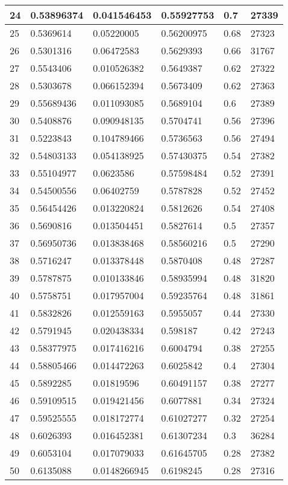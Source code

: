 \begin{longtable}{|l|l|l|l|l|l|}
24 & 0.53896374 & 0.041546453 & 0.55927753 & 0.7 & 27339 \\ \hline 
25 & 0.5369614 & 0.05220005 & 0.56200975 & 0.68 & 27323 \\ \hline 
26 & 0.5301316 & 0.06472583 & 0.5629393 & 0.66 & 31767 \\ \hline 
27 & 0.5543406 & 0.010526382 & 0.5649387 & 0.62 & 27322 \\ \hline 
28 & 0.5303678 & 0.066152394 & 0.5673409 & 0.62 & 27363 \\ \hline 
29 & 0.55689436 & 0.011093085 & 0.5689104 & 0.6 & 27389 \\ \hline 
30 & 0.5408876 & 0.090948135 & 0.5704741 & 0.56 & 27396 \\ \hline 
31 & 0.5223843 & 0.104789466 & 0.5736563 & 0.56 & 27494 \\ \hline 
32 & 0.54803133 & 0.054138925 & 0.57430375 & 0.54 & 27382 \\ \hline 
33 & 0.55104977 & 0.0623586 & 0.57598484 & 0.52 & 27391 \\ \hline 
34 & 0.54500556 & 0.06402759 & 0.5787828 & 0.52 & 27452 \\ \hline 
35 & 0.56454426 & 0.013220824 & 0.5812626 & 0.54 & 27408 \\ \hline 
36 & 0.5690816 & 0.013504451 & 0.5827614 & 0.5 & 27357 \\ \hline 
37 & 0.56950736 & 0.013838468 & 0.58560216 & 0.5 & 27290 \\ \hline 
38 & 0.5716247 & 0.013378448 & 0.5870408 & 0.48 & 27287 \\ \hline 
39 & 0.5787875 & 0.010133846 & 0.58935994 & 0.48 & 31820 \\ \hline 
40 & 0.5758751 & 0.017957004 & 0.59235764 & 0.48 & 31861 \\ \hline 
41 & 0.5832826 & 0.012559163 & 0.5955057 & 0.44 & 27330 \\ \hline 
42 & 0.5791945 & 0.020438334 & 0.598187 & 0.42 & 27243 \\ \hline 
43 & 0.58377975 & 0.017416216 & 0.6004794 & 0.38 & 27255 \\ \hline 
44 & 0.58805466 & 0.014472263 & 0.6025842 & 0.4 & 27304 \\ \hline 
45 & 0.5892285 & 0.01819596 & 0.60491157 & 0.38 & 27277 \\ \hline 
46 & 0.59109515 & 0.019421456 & 0.6077881 & 0.34 & 27324 \\ \hline 
47 & 0.59525555 & 0.018172774 & 0.61027277 & 0.32 & 27254 \\ \hline 
48 & 0.6026393 & 0.016452381 & 0.61307234 & 0.3 & 36284 \\ \hline 
49 & 0.6053104 & 0.017079033 & 0.61645705 & 0.28 & 27382 \\ \hline 
50 & 0.6135088 & 0.0148266945 & 0.6198245 & 0.28 & 27316 \\ \hline 
\end{longtable}